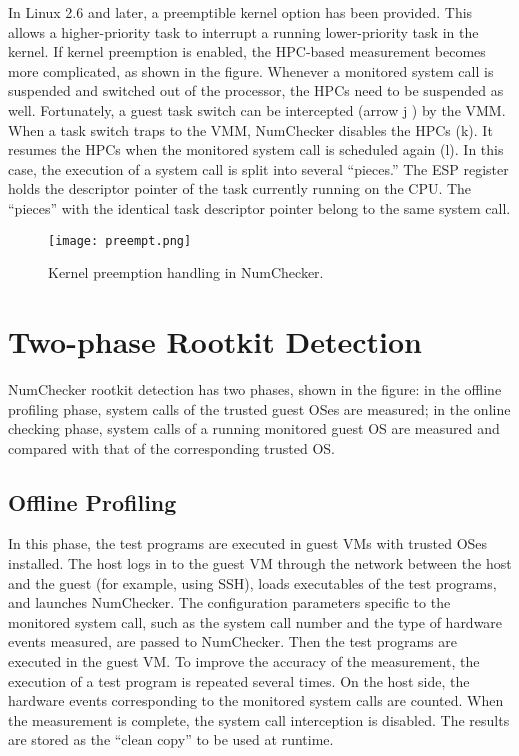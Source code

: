 \documentclass[12pt]{report}
\begin{document}
In Linux 2.6 and later, a preemptible kernel option has
been provided. This allows a higher-priority task to interrupt a
running lower-priority task in the kernel. If kernel preemption
is enabled, the HPC-based measurement becomes more complicated,
as shown in the figure. Whenever a monitored system
call is suspended and switched out of the processor, the HPCs
need to be suspended as well. Fortunately, a guest task switch
can be intercepted (arrow j ) by the VMM. When a
task switch traps to the VMM, NumChecker disables the HPCs
(k). It resumes the HPCs when the monitored system call is
scheduled again (l). In this case, the execution of a system
call is split into several “pieces.” The ESP register holds the
descriptor pointer of the task currently running on the CPU.
The “pieces” with the identical task descriptor pointer belong
to the same system call.

\begin{figure}[h]
\centering
\texttt{[image: preempt.png]}
\caption{Kernel preemption handling in NumChecker.}
\end{figure}

\section{Two-phase Rootkit Detection}
NumChecker rootkit detection has two phases, shown in
the figure: in the offline profiling phase, system calls of the
trusted guest OSes are measured; in the online checking phase,
system calls of a running monitored guest OS are measured
and compared with that of the corresponding trusted OS.

\subsection{Offline Profiling}
In this phase, the test programs are
executed in guest VMs with trusted OSes installed. The host
logs in to the guest VM through the network between the host
and the guest (for example, using SSH), loads executables of
the test programs, and launches NumChecker. The configuration
parameters specific to the monitored system call, such
as the system call number and the type of hardware events
measured, are passed to NumChecker. Then the test programs
are executed in the guest VM. To improve the accuracy of
the measurement, the execution of a test program is repeated
several times. On the host side, the hardware events corresponding
to the monitored system calls are counted. When
the measurement is complete, the system call interception is
disabled. The results are stored as the “clean copy” to be used
at runtime.
\end{document}
